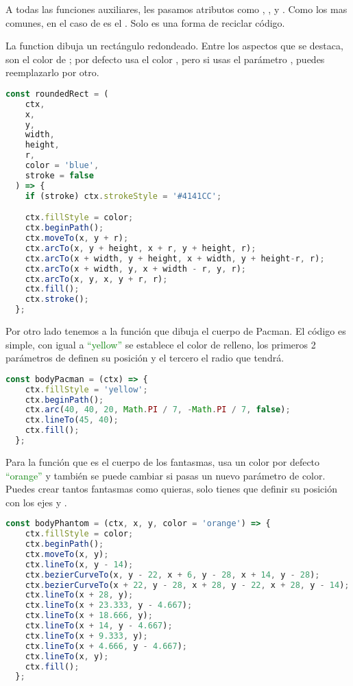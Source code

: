 A todas las funciones auxiliares, les pasamos atributos como , ,  y . Como los mas comunes, en el caso de  es el . Solo es una forma de reciclar código.

\vspace{0.5cm} %
La function  dibuja un rectángulo redondeado. Entre los aspectos que se destaca, son el color de ; por defecto usa el color , pero si usas el parámetro , puedes reemplazarlo por otro.

\begin{lstlisting}[language=TypeScript, style=mystyle]
  const roundedRect = (
    ctx,
    x,
    y,
    width,
    height,
    r,
    color = 'blue',
    stroke = false
  ) => {
    if (stroke) ctx.strokeStyle = '#4141CC';

    ctx.fillStyle = color;
    ctx.beginPath();
    ctx.moveTo(x, y + r);
    ctx.arcTo(x, y + height, x + r, y + height, r);
    ctx.arcTo(x + width, y + height, x + width, y + height-r, r);
    ctx.arcTo(x + width, y, x + width - r, y, r);
    ctx.arcTo(x, y, x, y + r, r);
    ctx.fill();
    ctx.stroke();
  };
\end{lstlisting}
\vspace{5mm} %

Por otro lado tenemos a la función  que dibuja el cuerpo de Pacman. El código es simple, con  igual a \textcolor{green}{``yellow''} se establece el color de relleno, los primeros 2 parámetros de  definen su posición y el tercero el radio que tendrá.

\begin{lstlisting}[language=TypeScript, style=mystyle]
  const bodyPacman = (ctx) => {
    ctx.fillStyle = 'yellow';
    ctx.beginPath();
    ctx.arc(40, 40, 20, Math.PI / 7, -Math.PI / 7, false);
    ctx.lineTo(45, 40);
    ctx.fill();
  };
\end{lstlisting}

\newpage %
Para la función  que es el cuerpo de los fantasmas, usa un color por defecto \textcolor{green}{``orange''} y también se puede cambiar si pasas un nuevo parámetro de color. Puedes crear tantos fantasmas como quieras, solo tienes que definir su posición con los ejes  y .

\begin{lstlisting}[language=TypeScript, style=mystyle]
  const bodyPhantom = (ctx, x, y, color = 'orange') => {
    ctx.fillStyle = color;
    ctx.beginPath();
    ctx.moveTo(x, y);
    ctx.lineTo(x, y - 14);
    ctx.bezierCurveTo(x, y - 22, x + 6, y - 28, x + 14, y - 28);
    ctx.bezierCurveTo(x + 22, y - 28, x + 28, y - 22, x + 28, y - 14);
    ctx.lineTo(x + 28, y);
    ctx.lineTo(x + 23.333, y - 4.667);
    ctx.lineTo(x + 18.666, y);
    ctx.lineTo(x + 14, y - 4.667);
    ctx.lineTo(x + 9.333, y);
    ctx.lineTo(x + 4.666, y - 4.667);
    ctx.lineTo(x, y);
    ctx.fill();
  };
\end{lstlisting}

